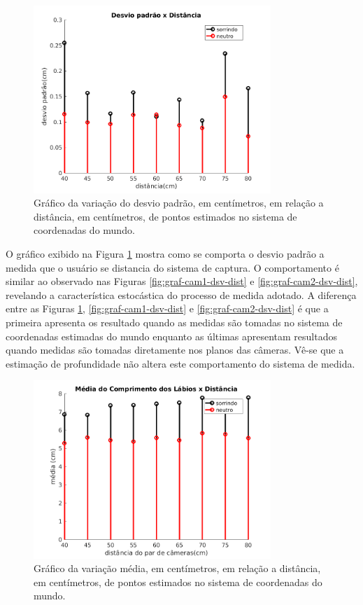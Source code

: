 \begin{figure}[!htpb]
\centering
\includegraphics[width=0.8\textwidth]{figs/thumbnail_distanciaCorrigida.jpg} 

\caption{Gráfico da variação do desvio padrão, em centímetros, em relação a
distância, em centímetros, de pontos estimados no sistema de coordenadas do
mundo.}

\label{fig:graf-3d-dsv-dist}
\end{figure}

O gráfico exibido na Figura \ref{fig:graf-3d-dsv-dist} mostra como se comporta o
desvio padrão a medida que o usuário se distancia do sistema de captura. O
comportamento é similar ao observado nas Figuras \ref{fig:graf-cam1-dsv-dist} e
\ref{fig:graf-cam2-dsv-dist}, revelando a característica estocástica do processo
de medida adotado. A diferença entre as Figuras  \ref{fig:graf-3d-dsv-dist},
\ref{fig:graf-cam1-dsv-dist} e \ref{fig:graf-cam2-dsv-dist} é que a primeira
apresenta os resultado quando as medidas são tomadas no sistema de coordenadas
estimadas do mundo enquanto as últimas apresentam resultados quando medidas são
tomadas diretamente nos planos das câmeras. Vê-se que a estimação de
profundidade não altera este comportamento do sistema de medida.

\begin{figure}[!htpb]
\centering
\includegraphics[width=0.8\textwidth]{figs/media3d.png} 

\caption{Gráfico da variação média, em centímetros, em relação a distância, em
centímetros, de pontos estimados no sistema de coordenadas do mundo.}

\label{fig:graf-3d-media-dist}
\end{figure}

